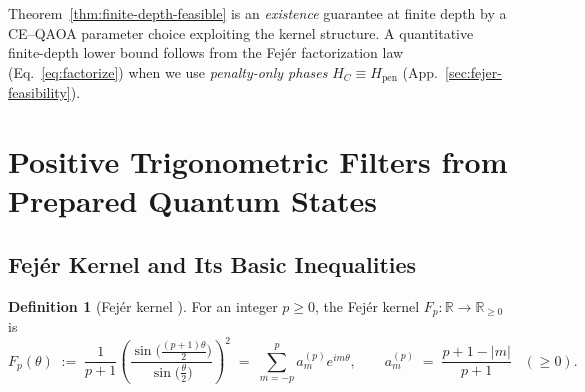 \documentclass[a4paper,unpublished,onecolumn,11pt]{quantumarticle}
\theoremstyle{definition}
\newtheorem{definition}[theorem]{Definition}
\theoremstyle{remark}
\begin{document}
Theorem~\ref{thm:finite-depth-feasible} is an \emph{existence} guarantee at finite depth by a CE--QAOA parameter choice exploiting the kernel structure.
A quantitative finite-depth lower bound follows from the Fej\'er factorization law (Eq.~\ref{eq:factorize}) when we use \emph{penalty-only phases} $H_C\equiv H_{\mathrm{pen}}$ (App.~\ref{sec:fejer-feasibility}). 





\section{Positive Trigonometric Filters from Prepared Quantum States}
\label{sec:fejer-proof}

\subsection{Fejér Kernel and Its Basic Inequalities}
\label{app:fejer}

\begin{definition}[Fejér kernel {\cite{Katznelson2004}}]
For an integer \(p\ge 0\), the Fejér kernel \(F_p:\mathbb R\to\mathbb R_{\ge 0}\) is
\begin{equation}
  F_p(\theta)
  \;:=\;
  \frac{1}{p+1}\left(\frac{\sin\!\bigl(\frac{(p+1)\theta}{2}\bigr)}{\sin\!\bigl(\frac{\theta}{2}\bigr)}\right)^2
  \;=\;
  \sum_{m=-p}^{p} a_m^{(p)} e^{i m \theta},
  \qquad
  a_m^{(p)} \;=\; \frac{p+1-|m|}{p+1}\;\;\;(\ge 0).
  \label{eq:fejer-def}
\end{equation}
\end{definition}
\end{document}
